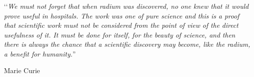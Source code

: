 \thispagestyle{empty}

\vspace*{\fill}

\lq \lq \emph{We must not forget that when radium was discovered, no one knew that it would prove useful in hospitals. The work was one of pure science and this is a proof that scientific work must not be considered from the point of view of the direct usefulness of it. It must be done for itself, for the beauty of science, and then there is always the chance that a scientific discovery may become, like the radium, a benefit for humanity.}''
\begin{flushright}
Marie Curie
\end{flushright}

\vspace*{\fill}